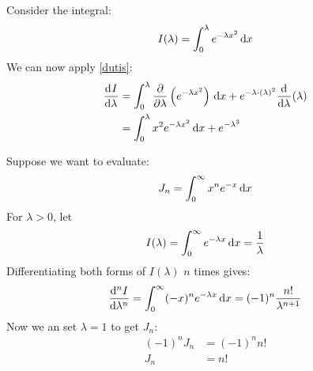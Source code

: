 \documentclass[../main.tex]{subfiles}
\begin{document}
\begin{example}
  Consider the integral:
  \[
    I(\lambda) = \int_{0}^{\lambda} e^{-\lambda x^2} \,\mathrm{d} x
  \]
  We can now apply \cref{dutis}:
  \begin{align*}
    \deriv{I}{\lambda} &= \int_{0}^{\lambda} \pderiv{}{\lambda}\left(e^{-\lambda x^2}\right) \d{x} + e^{-\lambda \cdot (\lambda)^2} \deriv{}{\lambda}(\lambda) \\
                       &= \int_{0}^{\lambda} x^2 e^{-\lambda x^2} \d{x} + e^{-\lambda^3}
  \end{align*}
\end{example}
\begin{example}
  Suppose we want to evaluate:
  \[
    J_n = \int_{0}^{\infty} x^{n}e^{-x} \,\mathrm{d} x
  \]
  For $\lambda > 0$, let
  \[
    I(\lambda) = \int_{0}^{\infty} e^{-\lambda x} \,\mathrm{d} x = \frac{1}{\lambda}
  \]
  Differentiating both forms of $I(\lambda)$ $n$ times gives:
  \[
    \deriv[n]{I}{\lambda} = \int_{0}^{\infty} (-x)^{n} e^{-\lambda x} \d{x} = (-1)^{n}\frac{n!}{\lambda^{n+1}}
  \]
  Now we an set $\lambda = 1$ to get $J_n$:
  \begin{align*}
    (-1)^{n} J_n &= (-1)^{n} n! \\
    J_n &= n! \\
  \end{align*}
\end{example}
\end{document}
